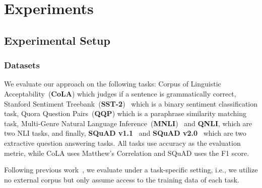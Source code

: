 \section{Experiments}
\subsection{Experimental Setup}
\subsubsection{Datasets} 
We evaluate our approach on the following tasks: Corpus of Linguistic Acceptability~(\textbf{CoLA}) which judges if a sentence is grammatically correct, Stanford Sentiment Treebank~(\textbf{SST-2})~\cite{sst2} which is 
a binary sentiment classification task,
Quora Question Pairs~(\textbf{QQP}) which is a paraphrase similarity matching task,
Multi-Genre Natural Language Inference~(\textbf{MNLI})~\cite{mnli} and \textbf{QNLI}, which are two NLI tasks, 
and finally, \textbf{SQuAD v1.1}~\cite{qnliandsquad} and \textbf{SQuAD v2.0}~\cite{squad2} which are two extractive 
question answering tasks. All tasks use accuracy as the evaluation metric, while CoLA uses Matthew's Correlation and SQuAD uses the F1 score.

Following previous work~\cite{pkd}, we evaluate under a task-specific setting, i.e., we utilize no external corpus but only assume access to the training data of each task.



